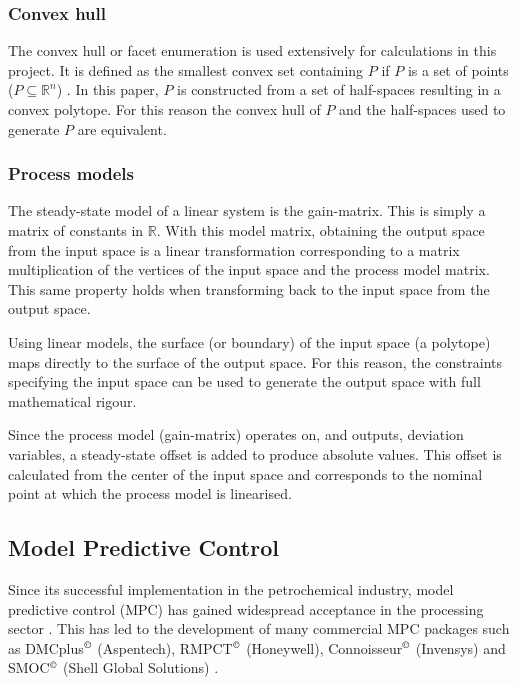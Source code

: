 \documentclass[final,authoryear,5pt,times,twocolumn]{elsarticle}
\begin{document}
\subsubsection{Convex hull}
The convex hull or facet enumeration is used extensively for calculations in this project.
It is defined as the smallest convex set containing $P$ if $P$ is a set of points ($P \subseteq \mathbb{R}^n$) \citep[74]{wenger}.
In this paper, $P$ is constructed from a set of half-spaces resulting in a convex polytope.
For this reason the convex hull of $P$ and the half-spaces used to generate $P$ are equivalent.

\subsubsection{Process models}
The steady-state model of a linear system is the gain-matrix.
This is simply a matrix of constants in $\mathbb{R}$.
With this model matrix, obtaining the output space from the input space is a linear transformation \citep[48-49,~166]{leung} corresponding to a matrix multiplication of the vertices of the input space and the process model matrix.
This same property holds when transforming back to the input space from the output space.

Using linear models, the surface (or boundary) of the input space (a polytope) maps directly to the surface of the output space.
For this reason, the constraints specifying the input space can be used to generate the output space with full mathematical rigour.

Since the process model (gain-matrix) operates on, and outputs, deviation variables, a steady-state offset is added to produce absolute values.
This offset is calculated from the center of the input space and corresponds to the nominal point at which the process model is linearised.

\subsection{Model Predictive Control}
Since its successful implementation in the petrochemical industry, model predictive control (MPC) has gained widespread acceptance in the processing sector \citep[1]{maciejowskimpc}. 
This has led to the development of many commercial MPC packages such as DMCplus$^{\copyright}$ (Aspentech), RMPCT$^{\copyright}$ (Honeywell), Connoisseur$^{\copyright}$ (Invensys) and SMOC$^{\copyright}$ (Shell Global Solutions) \citep{qinbadgwell}.
\end{document}
